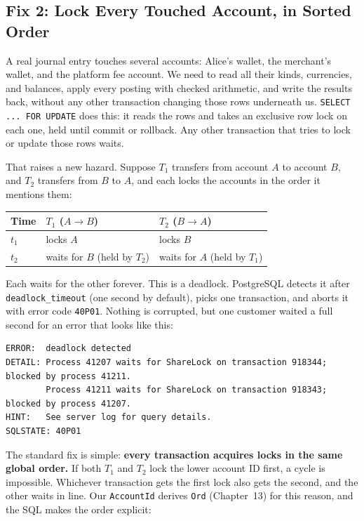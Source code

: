 \subsection{Fix 2: Lock Every Touched Account, in Sorted Order}

A real journal entry touches several accounts: Alice's wallet, the merchant's wallet, and the platform fee account. We need to read all their kinds, currencies, and balances, apply every posting with checked arithmetic, and write the results back, without any other transaction changing those rows underneath us. \texttt{SELECT ... FOR UPDATE} does this: it reads the rows and takes an exclusive row lock on each one, held until commit or rollback. Any other transaction that tries to lock or update those rows waits.

That raises a new hazard. Suppose $T_1$ transfers from account $A$ to account $B$, and $T_2$ transfers from $B$ to $A$, and each locks the accounts in the order it mentions them:
\begin{center}
\begin{tabular}{@{}lll@{}}
\toprule
\textbf{Time} & $T_1$ ($A \to B$) & $T_2$ ($B \to A$) \\
\midrule
$t_1$ & locks $A$ & locks $B$ \\
$t_2$ & waits for $B$ (held by $T_2$) & waits for $A$ (held by $T_1$) \\
\bottomrule
\end{tabular}
\end{center}
Each waits for the other forever. This is a deadlock. PostgreSQL detects it after \texttt{deadlock\_timeout} (one second by default), picks one transaction, and aborts it with error code \texttt{40P01}. Nothing is corrupted, but one customer waited a full second for an error that looks like this:
\begin{lstlisting}[language=Plain]
ERROR:  deadlock detected
DETAIL: Process 41207 waits for ShareLock on transaction 918344; blocked by process 41211.
        Process 41211 waits for ShareLock on transaction 918343; blocked by process 41207.
HINT:   See server log for query details.
SQLSTATE: 40P01
\end{lstlisting}

The standard fix is simple: \textbf{every transaction acquires locks in the same global order.} If both $T_1$ and $T_2$ lock the lower account ID first, a cycle is impossible. Whichever transaction gets the first lock also gets the second, and the other waits in line. Our \texttt{AccountId} derives \texttt{Ord} (Chapter~13) for this reason, and the SQL makes the order explicit:

